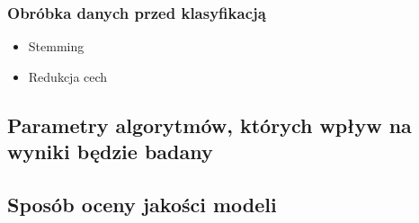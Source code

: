 \documentclass[a4paper, 10pt]{article}
\begin{document}
\subsubsection{Obróbka danych przed klasyfikacją}

\begin{itemize}
\item{Stemming}
\item{Redukcja cech}
\end{itemize}


\subsection{Parametry algorytmów, których wpływ na wyniki będzie badany}


\subsection{Sposób oceny jakości modeli}

\nocite{*}

\end{document}
